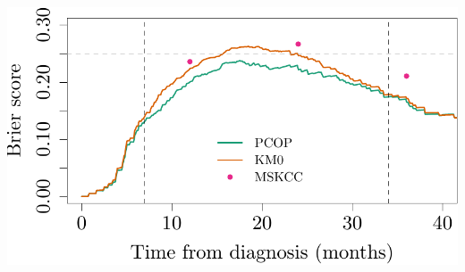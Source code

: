\documentclass{article}\usepackage[]{graphicx}\usepackage[]{color}
\makeatletter
\def\maxwidth{ %
  \ifdim\Gin@nat@width>\linewidth
    \linewidth
  \else
    \Gin@nat@width
  \fi
}
\newenvironment{knitrout}{}{} %
\makeatother
\begin{document}
\begin{knitrout}
{\centering \includegraphics[width=\maxwidth]{figure/07-prob-bs-paths-plot-glasgow-1} 

}



\end{knitrout}
\end{document}
